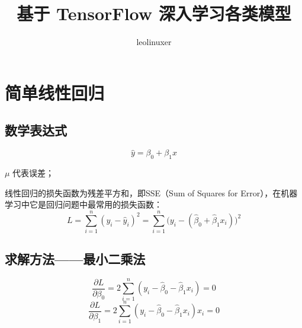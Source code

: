 \documentclass[12pt]{article}
\title{基于 TensorFlow 深入学习各类模型\cite{TensorFlow_Tutorial_Quick_Detailed}}
\author{leolinuxer}
\begin{document}
\maketitle
\tableofcontents

\section{简单线性回归}
\subsection{数学表达式}
$$
\hat{y} = \beta_0 + \beta_1 x
$$

$\mu$ 代表误差；

线性回归的损失函数为残差平方和，即SSE（Sum of Squares for Error），在机器学习中它是回归问题中最常用的损失函数：
$$
L = \sum_{i=1}^n(y_i - \hat{y}_i)^2 = \sum_{i=1}^n\Big(y_i - (\hat{\beta}_0 + \hat{\beta}_1x_i)\Big)^2
$$

\subsection{求解方法——最小二乘法}
$$
\frac{\partial L}{\partial \beta_0} = 2\sum_{i=1}^n(y_i - \hat{\beta}_0 - \hat{\beta}_1 x_i) = 0
$$
$$
\frac{\partial L}{\partial \beta_1} = 2\sum_{i=1}^n(y_i - \hat{\beta}_0 - \hat{\beta}_1 x_i) x_i = 0
$$
\end{document}
